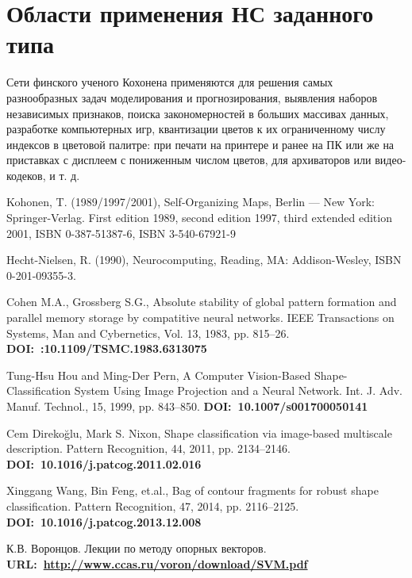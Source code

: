 \documentclass[12pt,a4paper]{article}
\begin{document}
\section{Области применения НС заданного типа}
Сети финского ученого Кохонена применяются для решения самых разнообразных задач моделирования и прогнозирования, выявления наборов независимых признаков, поиска закономерностей в больших массивах данных, разработке компьютерных игр, квантизации цветов к их ограниченному числу индексов в цветовой палитре: при печати на принтере и ранее на ПК или же на приставках с дисплеем с пониженным числом цветов, для архиваторов или видео-кодеков, и т. д. 


\newpage
\appendix 



\begin{thebibliography}{99}
  Kohonen, T. (1989/1997/2001), Self-Organizing Maps, Berlin — New York: Springer-Verlag. First edition 1989, second edition 1997, third extended edition 2001, ISBN 0-387-51387-6, ISBN 3-540-67921-9

 Hecht-Nielsen, R. (1990), Neurocomputing, Reading, MA: Addison-Wesley, ISBN 0-201-09355-3.

 Cohen M.A., Grossberg S.G., Absolute stability of global pattern formation and parallel memory storage by compatitive neural networks. IEEE Transactions on Systems, Man and Cybernetics, Vol. 13, 1983, pp. 815--26. \textbf{DOI:~:10.1109/TSMC.1983.6313075}
%
%

 Tung-Hsu Hou and Ming-Der Pern, A Computer Vision-Based Shape-Classification System Using
Image Projection and a Neural Network.
Int. J. Adv. Manuf. Technol., 15, 1999, pp. 843--850.
\textbf{DOI:~10.1007/s001700050141}

 Cem Direko\u{g}lu, Mark S. Nixon, Shape classification via image-based multiscale description.
Pattern Recognition, 44, 2011, pp. 2134--2146. \textbf{DOI:~10.1016/j.patcog.2011.02.016}

 Xinggang Wang, Bin Feng, et.al., Bag of contour fragments for robust shape classification.
Pattern Recognition, 47, 2014, pp. 2116--2125. \textbf{DOI:~10.1016/j.patcog.2013.12.008}

 К.В. Воронцов. Лекции по методу опорных векторов. \textbf{URL:~\url{http://www.ccas.ru/voron/download/SVM.pdf}}

\end{thebibliography}
\end{document}

